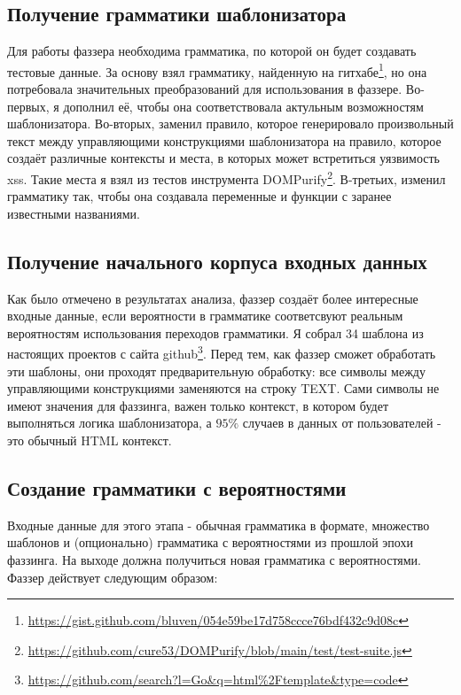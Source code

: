 \documentclass[a4paper]{article}
\begin{document}
\subsection{Получение грамматики шаблонизатора}

Для работы фаззера необходима грамматика, по которой он будет создавать тестовые данные. За основу взял грамматику, найденную на гитхабе\footnote{\href{https://gist.github.com/bluven/054e59be17d758ccce76bdf432c9d08c}{https://gist.github.com/bluven/054e59be17d758ccce76bdf432c9d08c}}, но она потребовала значительных преобразований для использования в фаззере. Во-первых, я дополнил её, чтобы она соответствовала актульным возможностям шаблонизатора. Во-вторых, заменил правило, которое генерировало произвольный текст между управляющими конструкциями шаблонизатора на правило, которое создаёт различные контексты и места, в которых может встретиться уязвимость xss. Такие места я взял из тестов инструмента DOMPurify\footnote{\href{https://github.com/cure53/DOMPurify/blob/main/test/test-suite.js}{https://github.com/cure53/DOMPurify/blob/main/test/test-suite.js}}. В-третьих, изменил грамматику так, чтобы она создавала переменные и функции с заранее известными названиями.

\subsection{Получение начального корпуса входных данных}

Как было отмечено в результатах анализа, фаззер создаёт более интересные входные данные, если вероятности в грамматике соответсвуют реальным вероятностям использования переходов грамматики. Я собрал 34 шаблона из настоящих проектов с сайта github\footnote{\href{https://github.com/search?l=Go\&q=html\%2Ftemplate\&type=code}{https://github.com/search?l=Go\&q=html\%2Ftemplate\&type=code}}. Перед тем, как фаззер сможет обработать эти шаблоны, они проходят предварительную обработку: все символы между управляющими конструкциями заменяются на строку TEXT. Сами символы не имеют значения для фаззинга, важен только контекст, в котором будет выполняться логика шаблонизатора, а $95\%$ случаев в данных от пользователей - это обычный HTML контекст.

\subsection{Создание грамматики с вероятностями}
Входные данные для этого этапа - обычная грамматика в формате, множество шаблонов и (опционально) грамматика с вероятностями из прошлой эпохи фаззинга. На выходе должна получиться новая грамматика с вероятностями. Фаззер действует следующим образом:
\end{document}
